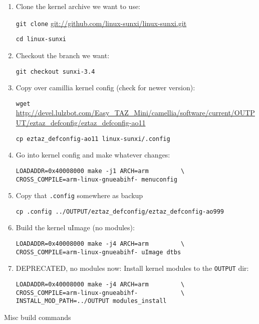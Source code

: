 \begin{enumerate}
  \item{Clone the kernel archive we want to use:
  
  \verb|git clone| \url{git://github.com/linux-sunxi/linux-sunxi.git}
  
  \verb|cd linux-sunxi|
  }

  \item{Checkout the branch we want:
  
  \verb|git checkout sunxi-3.4|
  }

  \item{Copy over camillia kernel config (check for newer version):
  
  \verb|wget| \url{http://devel.lulzbot.com/Easy_TAZ_Mini/camellia/software/current/OUTPUT/eztaz_defconfig/eztaz_defconfig-ao11}
  
  \verb|cp eztaz_defconfig-ao11 linux-sunxi/.config|
  }

  \item{Go into kernel config and make whatever changes:

  \begin{verbatim}
LOADADDR=0x40008000 make -j1 ARCH=arm         \
CROSS_COMPILE=arm-linux-gnueabihf- menuconfig
  \end{verbatim}
  }

  \item{Copy that \verb|.config| somewhere as backup
  
  \verb|cp .config ../OUTPUT/eztaz_defconfig/eztaz_defconfig-ao999|
  }

  \item{Build the kernel uImage (no modules):
  
  \begin{verbatim}
LOADADDR=0x40008000 make -j4 ARCH=arm         \
CROSS_COMPILE=arm-linux-gnueabihf- uImage dtbs
  \end{verbatim}
  }

  \item{DEPRECATED, no modules now:
  Install kernel modules to the \texttt{OUTPUT} dir:

  \begin{verbatim}
LOADADDR=0x40008000 make -j4 ARCH=arm         \
CROSS_COMPILE=arm-linux-gnueabihf-            \
INSTALL_MOD_PATH=../OUTPUT modules_install
  \end{verbatim}
  }

\end{enumerate}


Misc build commands

